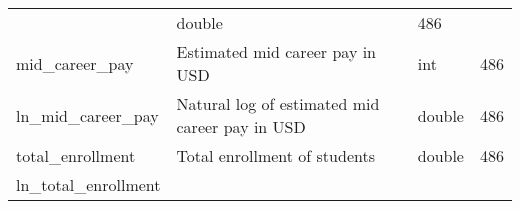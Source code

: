 \documentclass[
]{article}
\begin{document}
\begin{longtable}[]{@{}llll@{}}
\begin{minipage}[t]{0.28\columnwidth}
\end{minipage} & \begin{minipage}[t]{0.18\columnwidth}\raggedright
double\strut
\end{minipage} & \begin{minipage}[t]{0.23\columnwidth}\raggedright
486\strut
\end{minipage}\tabularnewline
\begin{minipage}[t]{0.19\columnwidth}\raggedright
mid\_career\_pay\strut
\end{minipage} & \begin{minipage}[t]{0.28\columnwidth}\raggedright
Estimated mid career pay in USD\strut
\end{minipage} & \begin{minipage}[t]{0.18\columnwidth}\raggedright
int\strut
\end{minipage} & \begin{minipage}[t]{0.23\columnwidth}\raggedright
486\strut
\end{minipage}\tabularnewline
\begin{minipage}[t]{0.19\columnwidth}\raggedright
ln\_mid\_career\_pay\strut
\end{minipage} & \begin{minipage}[t]{0.28\columnwidth}\raggedright
Natural log of estimated mid career pay in USD\strut
\end{minipage} & \begin{minipage}[t]{0.18\columnwidth}\raggedright
double\strut
\end{minipage} & \begin{minipage}[t]{0.23\columnwidth}\raggedright
486\strut
\end{minipage}\tabularnewline
\begin{minipage}[t]{0.19\columnwidth}\raggedright
total\_enrollment\strut
\end{minipage} & \begin{minipage}[t]{0.28\columnwidth}\raggedright
Total enrollment of students\strut
\end{minipage} & \begin{minipage}[t]{0.18\columnwidth}\raggedright
double\strut
\end{minipage} & \begin{minipage}[t]{0.23\columnwidth}\raggedright
486\strut
\end{minipage}\tabularnewline
\begin{minipage}[t]{0.19\columnwidth}\raggedright
ln\_total\_enrollment\strut
\end{minipage} & \begin{minipage}[t]{0.28\columnwidth}\raggedright

\end{minipage}
\end{longtable}
\end{document}
